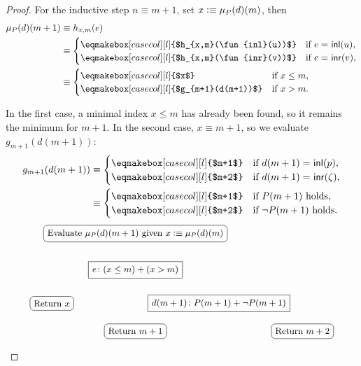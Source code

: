 \begin{proof}
    For the inductive step $n\equiv m+1$, set $x\mathrel{\vcentcolon}\equiv\mu_P(d)(m)$, then
    {\small
    \begin{align*}
        \mu_P(d)(m+1)
            &\equiv h_{x,m}(e)\\
            &\equiv\begin{cases}
                \eqmakebox[casecol][l]{$h_{x,m}(\fun{inl}(u))$}
                    &\text{if }e\eq{}\fun{inl}(u),\\
                \eqmakebox[casecol][l]{$h_{x,m}(\fun{inr}(v))$}
                    &\text{if }e\eq{}\fun{inr}(v),
            \end{cases}\\
            &\equiv\begin{cases}
                \eqmakebox[casecol][l]{$x$}
                    &\text{if }x\le m,\\
                \eqmakebox[casecol][l]{$g_{m+1}(d(m+1))$}
                    &\text{if }x>m.
            \end{cases}
    \end{align*}}
    
    In the first case, a minimal index $x\le m$ has already been found, so it remains the minimum for $m+1$. In the second case, $x\equiv m+1$, so we evaluate $g_{m+1}(d(m+1))$:
    {\small
    \begin{align*}
        g_{m+1}(d(m+1))
            &\equiv\begin{cases}
                \eqmakebox[casecol][l]{$m+1$}
                    &\text{if }d(m+1)\eq{}\fun{inl}(p),\\
                \eqmakebox[casecol][l]{$m+2$}
                    &\text{if }d(m+1)\eq{}\fun{inr}(\zeta),
            \end{cases}\\
            &\equiv\begin{cases}
                \eqmakebox[casecol][l]{$m+1$}
                    &\text{if }P(m+1)\text{ holds},\\
                \eqmakebox[casecol][l]{$m+2$}
                    &\text{if }\neg P(m+1)\text{ holds}.
            \end{cases}
    \end{align*}}
    \[
    \begin{tikzpicture}[>=stealth,font=\small,scale=1.0]
        \node (start) at (0, 0) [draw, rounded corners, inner sep=4pt] {Evaluate $\mu_P(d)(m+1)$ given $x \defeq \mu_P(d)(m)$};
        \node (dec1) at (0, -1.3) [draw, inner sep=4pt] {$e \colon (x \le m) + (x > m)$};
        \node (retX) at (-3.0, -2.5) [draw, rounded corners, inner sep=4pt] {Return $x$};
        \node (dec2) at (3.0, -2.5) [draw, inner sep=4pt] {$d(m+1) \colon P(m+1) + \neg P(m+1)$};
        \node (retM1) at (0.0, -3.5) [draw, rounded corners, inner sep=4pt] {Return $m+1$};
        \node (retM2) at (6.0, -3.5) [draw, rounded corners, inner sep=4pt] {Return $m+2$};
    

\end{tikzpicture}\]
\end{proof}
